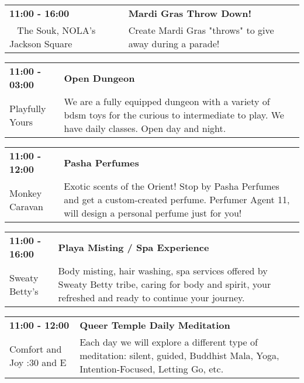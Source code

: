\begin{tabular}{ p{1in} p{2.2in} }
    \textbf{11:00 - 16:00} & \textbf{Mardi Gras Throw Down!} \\
    ~ \newline The Souk, NOLA's Jackson Square  & Create Mardi Gras "throws" to give away during a parade! \\
    \hline 
\end{tabular}
    
\begin{tabular}{ p{1in} p{2.2in} }
    \textbf{11:00 - 03:00} & \textbf{Open Dungeon} \\
    Playfully Yours \newline  & We are a fully equipped dungeon with a variety of bdsm toys for the curious to intermediate to play. We have daily classes. Open day and night. \\
    \hline 
\end{tabular}
    
\begin{tabular}{ p{1in} p{2.2in} }
    \textbf{11:00 - 12:00} & \textbf{Pasha Perfumes} \\
    Monkey Caravan \newline  & Exotic scents of the Orient! Stop by Pasha Perfumes and get a custom-created perfume.  Perfumer Agent 11, will design a personal perfume just for you! \\
    \hline 
\end{tabular}
    
\begin{tabular}{ p{1in} p{2.2in} }
    \textbf{11:00 - 16:00} & \textbf{Playa Misting / Spa Experience} \\
    Sweaty  Betty's \newline  & Body misting, hair washing, spa services offered by Sweaty Betty tribe, caring for body and spirit, your refreshed and ready to continue your journey. \\
    \hline 
\end{tabular}
    
\begin{tabular}{ p{1in} p{2.2in} }
    \textbf{11:00 - 12:00} & \textbf{Queer Temple Daily Meditation} \\
    Comfort and Joy \newline 7:30 and E & Each day we will explore a different type of meditation: silent, guided, Buddhist Mala, Yoga, Intention-Focused, Letting Go, etc. \\
    \hline 
\end{tabular}
    

